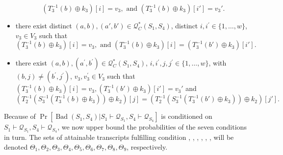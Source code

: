 \begin{itemize}
  $$\left(T_{3}^{-1}\left(b\right) \oplus k_{3}\right)[i] = v_3,\text{ and }
  \left(T_{3}^{-1}\left(b\right) \oplus k_{3}\right)[i'] = v_3'.$$
  \item[\ceight]
  there exist distinct $(a, b),(a',b') \in \mathcal{Q}_{C}^{*}\left(S_{1}, S_{4}\right)$, distinct $i, i^{\prime}\in\{1, \ldots, w\}$, $v_{3} \in V_{3}$ such that
  $$\left(T_{3}^{-1}\left(b\right) \oplus k_{3}\right)[i] = v_3,\text{ and }
 \left(T_{3}^{-1}\left(b\right) \oplus k_{3}\right)[i] =\left(T_{3}^{-1}\left(b'\right) \oplus k_{3}\right)[i'].$$
  \item[\cnine]
  there exist $(a, b), (a^{\prime}, b^{\prime}) \in \mathcal{Q}_{C}^{*}\left(S_{1}, S_{4}\right)$, $i, i^{\prime}, j, j^{\prime} \in\{1, \ldots, w\}$, with$(b, j) \neq \left(b^{\prime}, j^{\prime}\right)$, $v_{3},v_{3}^{\prime} \in V_{3}$ such that $\left(T_{3}^{-1}\left(b\right) \oplus k_{3}\right)[i] = v_3, \left(T_{3}^{-1}\left(b'\right) \oplus k_{3}\right)[i'] = v_3'$ and
$$
  \left(T_{2}^{-1}\left(S_{3}^{-1}\left(T_{3}^{-1}\left(b\right) \oplus k_{3}\right)\right) \oplus k_{2}\right)[j]= \left(T_{2}^{-1}\left(S_{3}^{-1}\left(T_{3}^{-1}\left(b'\right) \oplus k_{3}\right)\right) \oplus k_{2}\right)[j'].
$$
\end{itemize}

Because of $\operatorname{Pr}\left[\operatorname{Bad}\left(S_{1},S_{4}\right) | S_{1} \vdash \mathcal{Q}_{S_{1}}, S_{4} \vdash \mathcal{Q}_{S_{4}}\right]$ is conditioned on $S_{1} \vdash \mathcal{Q}_{S_{1}}, S_{4} \vdash \mathcal{Q}_{S_{4}}$, we now upper bound the probabilities of the seven conditions in turn. The sets of attainable transcripts fulfilling condition \cone, \ctwo, \cthree, \cfour, \cfive, \csix, \cseven will be denoted $\Theta_{1}, \Theta_{2}, \Theta_{3}, \Theta_{4}, \Theta_{5}, \Theta_{6}, \Theta_{7}, \Theta_{8}, \Theta_{9}$, respectively.\\

